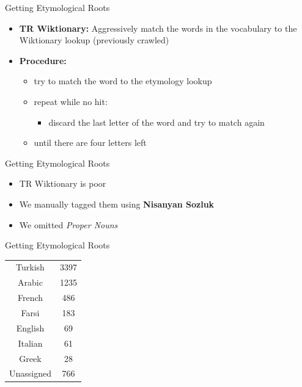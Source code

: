 \documentclass[pdf]{beamer}
\begin{document}
\begin{frame}{Getting Etymological Roots}
	
	\begin{itemize}
		\item {\bf TR Wiktionary:} Aggressively match the words in the vocabulary to the Wiktionary lookup (previously crawled)
		\item {\bf Procedure:}
		\begin{itemize}
			\item try to match the word to the etymology lookup
			\item repeat while no hit:
			\begin{itemize}
				\item discard the last letter of the word and try to match again
			\end{itemize}
			\item until there are four letters left
		\end{itemize}
	\end{itemize}
	
\end{frame}

\begin{frame}{Getting Etymological Roots}
	
	\begin{itemize}
		\item TR Wiktionary is poor
		\item We manually tagged them using {\bf Nisanyan Sozluk}
		\item We omitted \textit{Proper Nouns} 
	\end{itemize}
	
\end{frame}

\begin{frame}{Getting Etymological Roots}
	
	\begin{tabular}{c|c}
		Turkish&3397\\
		Arabic&1235\\
		French&486\\
		Farsi&183\\
		English&69\\
		Italian&61\\
		Greek&28\\
		Unassigned&766\\
	\end{tabular}
	
\end{frame}
\end{document}
